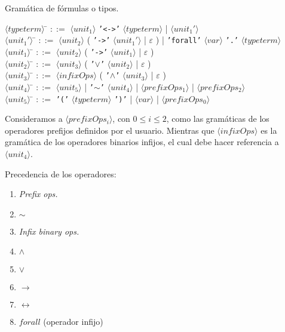 \documentclass[a4paper,11pt]{article}
\begin{document}
Gramática de fórmulas o tipos.

\begin{tabbing}
$\langle typeterm \rangle$ \= $::=$ $\langle unit_{1} \rangle$ \texttt{'<->'} $\langle typeterm \rangle$ | $\langle unit_{1}' \rangle$\\
$\langle unit_{1}' \rangle$ \= $::=$ $\langle unit_{2} \rangle$ ( \texttt{'->'} $\langle unit_{1}' \rangle$ | $\varepsilon$ ) 
| \texttt{'forall'} $\langle var \rangle$ \texttt{'.'} $\langle typeterm \rangle$\\
$\langle unit_{1} \rangle$ \= $::=$ $\langle unit_{2} \rangle$ ( \texttt{'->'} $\langle unit_{1} \rangle$ | $\varepsilon$ ) \\
$\langle unit_{2} \rangle$ \= $::=$ $\langle unit_{3} \rangle$ ( \texttt{'$\vee$'} $\langle unit_{2} \rangle$ | $\varepsilon$ ) \\
$\langle unit_{3} \rangle$ \= $::=$ $\langle infixOps \rangle$ ( \texttt{'$\wedge$'} $\langle unit_{3} \rangle$ | $\varepsilon$ ) \\
$\langle unit_{4} \rangle$ \= $::=$ $\langle unit_{5} \rangle$ | \texttt{'$\sim$'} $\langle unit_{4} \rangle$ |
$\langle prefixOps_{1} \rangle$ | $\langle prefixOps_{2} \rangle$ \\
$\langle unit_{5} \rangle$ \= $::=$ \texttt{'('} $\langle typeterm \rangle$ \texttt{')'} | $\langle var \rangle$ | 
$\langle prefixOps_{0} \rangle$

\end{tabbing}

Consideramos a $\langle prefixOps_{i} \rangle$, con $0 \leq i \leq 2$, como las gramáticas de los operadores prefijos definidos por el usuario.
Mientras que $\langle infixOps \rangle$ es la gramática de los operadores binarios infijos, el cual debe hacer referencia a $\langle unit_{4} \rangle$.

Precedencia de los operadores:
\begin{enumerate}
  \item \textit{Prefix ops.}
  \item $\sim$
  \item \textit{Infix binary ops.}
  \item $\wedge$
  \item $\vee$
  \item $\rightarrow$
  \item $\leftrightarrow$
  \item $forall$ (operador infijo)
\end{enumerate}
\end{document}

